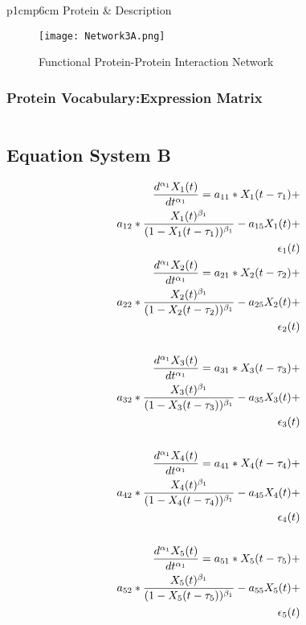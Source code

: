 \begin{table}[H]\tiny
\caption{Gene and Protein Annotations}	
	\begin{tabular}{p{1cm}p{6cm}}
		\hline
		Protein & Description \\   
		\hline
	\hline
\end{tabular}
\end{table}

\begin{figure}[H]
	\centering
	\begin{minipage}[b]{1\linewidth}
		\texttt{[image: Network3A.png]}
	\end{minipage}\hfill
	\caption{Functional Protein-Protein Interaction Network}
	\label{fig:Figure1}
\end{figure} 


\subsubsection{Protein Vocabulary:Expression Matrix}

\begin{equation}
\end{equation}

\subsection{Equation System B}

\begin{align*} 
\tiny
\frac{d^{\alpha_1}X_1(t)}{dt^{\alpha_1}} = a_{11} *X_1(t - \tau_1) + \\
a_{12} *\frac{X_1(t)^{\beta_1}}{(1-X_1(t - \tau_1))^{\beta_1}} - a_{15}X_1(t) + \\
\epsilon_1(t) \\
\frac{d^{\alpha_1}X_2(t)}{dt^{\alpha_1}} = a_{21} *X_2(t - \tau_2) + \\
a_{22} *\frac{X_2(t)^{\beta_1}}{(1-X_2(t - \tau_2))^{\beta_1}} - a_{25}X_2(t) + \\
\epsilon_2(t) \\ \\
\frac{d^{\alpha_1}X_3(t)}{dt^{\alpha_1}} = a_{31} *X_3(t - \tau_3) + \\
a_{32} *\frac{X_3(t)^{\beta_1}}{(1-X_3(t - \tau_3))^{\beta_1}} - a_{35}X_3(t) + \\
\epsilon_3(t) \\ \\
\frac{d^{\alpha_1}X_4(t)}{dt^{\alpha_1}} = a_{41} *X_4(t - \tau_4) + \\
a_{42} *\frac{X_4(t)^{\beta_1}}{(1-X_4(t - \tau_4))^{\beta_1}} - a_{45}X_4(t) + \\
\epsilon_4(t) \\ \\
\frac{d^{\alpha_1}X_5(t)}{dt^{\alpha_1}} = a_{51} *X_5(t - \tau_5) + \\
a_{52} *\frac{X_5(t)^{\beta_1}}{(1-X_5(t - \tau_5))^{\beta_1}} - a_{55}X_5(t) + \\
\epsilon_5(t) \\
\end{align*}

